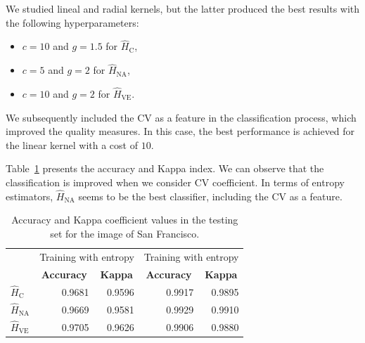 \documentclass[journal]{IEEEtran}
\begin{document}


We studied lineal and radial kernels, but the latter produced the best results with the following hyperparameters:
\begin{itemize}
	\item $c=10$ and $g=1.5$ for $\widehat{H}_\text{C}$,
	\item $c=5$ and $g=2$ for $\widehat{H}_{\text{NA}}$,
	\item $c=10$ and $g=2$ for $\widehat{H}_{\text{VE}}$.
\end{itemize}

We subsequently included the CV as a feature in the classification process, which improved the quality measures. In this case, the best performance is achieved for the linear kernel with a cost of $10$.

Table~\ref{tab:acc_SF} presents the accuracy and Kappa index. 
We can observe that the classification is improved when we consider CV coefficient. In terms of entropy estimators, $\widehat{H}_{\text{NA}}$ seems to be the best classifier, including the CV as a feature.

\begin{table}[htbp]
	\centering
	\caption{Accuracy and Kappa coefficient values in the testing set for the image of San Francisco.}
	\begin{tabular}{lrrrr}
		\toprule
		& \multicolumn{2}{c}{\multirow{2}[-2]{*}{Training with entropy}} & \multicolumn{2}{c}{\multirow{2}[-2]{*}{Training with entropy}} \\
		& \multicolumn{2}{c}{estimators} & \multicolumn{2}{c}{estimators and cv} \\ \cmidrule(lr){2-3}\cmidrule(lr){4-5}          
		& \multicolumn{1}{c}{\textbf{Accuracy}} & \multicolumn{1}{c}{\textbf{Kappa}} & \multicolumn{1}{c}{\textbf{Accuracy}} & \multicolumn{1}{c}{\textbf{Kappa}} \\
		\cmidrule(lr){2-2}\cmidrule(lr){3-3}\cmidrule(lr){4-4}\cmidrule(lr){5-5}
		$\widehat{H}_\text{C}$    & 0.9681 & 0.9596 & 0.9917 & 0.9895 \\
		$\widehat{H}_{\text{NA}}$   & 0.9669 & 0.9581 & 0.9929 & 0.9910 \\
		$\widehat{H}_{\text{VE}}$   & 0.9705 & 0.9626 & 0.9906 & 0.9880 \\
		\bottomrule
	\end{tabular}%
	\label{tab:acc_SF}%
\end{table}%
\end{document}
